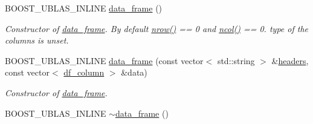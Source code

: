 \begin{DoxyCompactItemize}
\item 
B\+O\+O\+S\+T\+\_\+\+U\+B\+L\+A\+S\+\_\+\+I\+N\+L\+I\+NE \hyperlink{classboost_1_1numeric_1_1ublas_1_1data__frame_a1fe0c252f16d65762717c1da13432e8f}{data\+\_\+frame} ()\hypertarget{classboost_1_1numeric_1_1ublas_1_1data__frame_a1fe0c252f16d65762717c1da13432e8f}{}\label{classboost_1_1numeric_1_1ublas_1_1data__frame_a1fe0c252f16d65762717c1da13432e8f}

\begin{DoxyCompactList}\small\item\em Constructor of \hyperlink{classboost_1_1numeric_1_1ublas_1_1data__frame}{data\+\_\+frame}. By default {\ttfamily \hyperlink{classboost_1_1numeric_1_1ublas_1_1data__frame_a7f773294cbd41d890b5469e2a85abd32}{nrow()}} == 0 and \hyperlink{classboost_1_1numeric_1_1ublas_1_1data__frame_adf7817e6cf0dcc7fa6d892a351b5c9a8}{ncol()} == 0. type of the columns is unset. \end{DoxyCompactList}\item 
B\+O\+O\+S\+T\+\_\+\+U\+B\+L\+A\+S\+\_\+\+I\+N\+L\+I\+NE \hyperlink{classboost_1_1numeric_1_1ublas_1_1data__frame_a1cfb2a3083283f2aceff85649120ce61}{data\+\_\+frame} (const vector$<$ std\+::string $>$ \&\hyperlink{classboost_1_1numeric_1_1ublas_1_1data__frame_aff5e603e988e7b710a3df6104d706c12}{headers}, const vector$<$ \hyperlink{classboost_1_1numeric_1_1ublas_1_1df__column}{df\+\_\+column} $>$ \&data)
\begin{DoxyCompactList}\small\item\em Constructor of \hyperlink{classboost_1_1numeric_1_1ublas_1_1data__frame}{data\+\_\+frame}. \end{DoxyCompactList}\item 
B\+O\+O\+S\+T\+\_\+\+U\+B\+L\+A\+S\+\_\+\+I\+N\+L\+I\+NE \hyperlink{classboost_1_1numeric_1_1ublas_1_1data__frame_a5ab7148ee2440c33f10b59c466eba998}{$\sim$data\+\_\+frame} ()\hypertarget{classboost_1_1numeric_1_1ublas_1_1data__frame_a5ab7148ee2440c33f10b59c466eba998}{}\label{classboost_1_1numeric_1_1ublas_1_1data__frame_a5ab7148ee2440c33f10b59c466eba998}


\end{DoxyCompactItemize}
